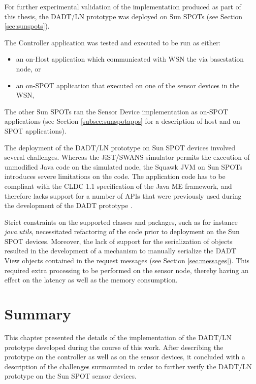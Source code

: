 For further experimental validation of the implementation produced as part of 
this thesis, the DADT/LN prototype was deployed on Sun SPOTs
\cite{simon_squawk:2006} (see Section \ref{sec:sunspots}).

The Controller application was tested and executed to be run as either:
\begin{itemize}
  \item an on-Host application which communicated with WSN the via basestation node, or 
  \item an on-SPOT application that executed on one of the sensor devices in the WSN, 
\end{itemize}
The other Sun SPOTs ran the Sensor Device implementation as on-SPOT applications
(see Section \ref{subsec:sunspotapps} for a description of host and on-SPOT
applications).

The deployment of the DADT/LN prototype on Sun SPOT devices involved several
challenges. Whereas the JiST/SWANS simulator permits the execution of unmodified Java code
on the simulated node, the Squawk JVM on Sun SPOTs introduces severe limitations
on the code. The application code has to be compliant with the CLDC 1.1 specification
of the Java ME framework, and therefore lacks support for a number of APIs that were
previously used during the development of the DADT prototype \cite{migliavacca_DADT:2006}.

Strict constraints on the supported classes and packages,
such as for instance \emph{java.utils}, necessitated refactoring of the code
prior to deployment
on the Sun SPOT devices. Moreover, the lack of support for the serialization of
objects resulted in the
development of a mechanism to manually serialize the DADT View objects contained in the request messages (see Section
\ref{sec:messages}). This required extra processing to be performed on the
sensor node, thereby having an effect on the latency as well as the memory consumption.

\section{Summary}

This chapter presented the details of the implementation of the DADT/LN
prototype developed during the course of this work. After describing the
prototype on the controller as well as on the sensor devices, it concluded with a
description of the challenges surmounted in
order to further verify the DADT/LN prototype on the Sun SPOT sensor devices.